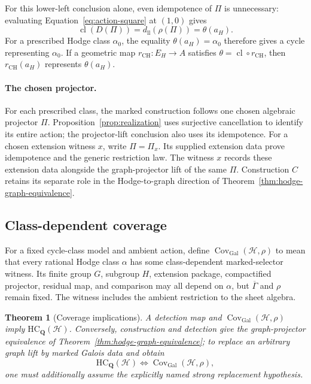 \documentclass[11pt]{article}
\newtheorem{theorem}{Theorem}[section]
\theoremstyle{definition}
\theoremstyle{remark}
\newcommand{\Q}{\mathbf Q}
\newcommand{\Gbar}{\overline{\Gamma}}
\begin{document}
For this lower-left conclusion alone, even idempotence of \(\Pi\) is
unnecessary: evaluating Equation~\eqref{eq:action-square} at \((1,0)\)
gives
\[
  \operatorname{cl}(D(\Pi))
    =d_{\mathrm{ll}}(\rho(\Pi))=\theta(a_H).
\]
For a prescribed Hodge class \(\alpha_0\), the equality
\(\theta(a_H)=\alpha_0\) therefore gives a cycle representing
\(\alpha_0\). If a geometric map \(r_{\mathrm{CH}}:E_H\to A\) satisfies
\(\theta=\operatorname{cl}\circ r_{\mathrm{CH}}\), then
\(r_{\mathrm{CH}}(a_H)\) represents \(\theta(a_H)\).

\paragraph{The chosen projector.}
For each prescribed class, the marked construction follows one chosen
algebraic projector \(\Pi\).  Proposition~\ref{prop:realization} uses
surjective cancellation to identify its entire action; the projector-lift
conclusion also uses its idempotence.  For a chosen extension witness \(x\),
write \(\Pi=\Pi_x\).  Its supplied extension data prove idempotence and
the generic restriction law.  The witness \(x\) records these extension data alongside the
graph-projector lift of the same \(\Pi\).  Construction \(C\) retains its separate role
in the Hodge-to-graph direction of Theorem~\ref{thm:hodge-graph-equivalence}.

\subsection{Class-dependent coverage}

For a fixed cycle-class model and ambient action, define
\(\operatorname{Cov}_{\mathrm{Gal}}(\mathscr H,\rho)\) to mean that every
rational Hodge class \(\alpha\) has some class-dependent marked-selector
witness.  Its finite group \(G\), subgroup \(H\), extension package,
compactified projector, residual map, and comparison may all depend on
\(\alpha\), but \(\Gbar\) and \(\rho\) remain fixed.  The witness includes the ambient restriction to the sheet algebra.

\begin{theorem}[Coverage implications]
\label{thm:coverage}
A detection map and
\(\operatorname{Cov}_{\mathrm{Gal}}(\mathscr H,\rho)\) imply
\(\mathrm{HC}_{\Q}(\mathscr H)\).  Conversely, construction and detection
give the graph-projector equivalence of
Theorem~\ref{thm:hodge-graph-equivalence}; to replace an arbitrary graph lift
by marked Galois data and obtain
\[
  \mathrm{HC}_{\Q}(\mathscr H)
  \Longleftrightarrow
  \operatorname{Cov}_{\mathrm{Gal}}(\mathscr H,\rho),
\]
one must additionally assume the explicitly named strong replacement
hypothesis.
\end{theorem}
\end{document}
